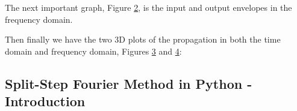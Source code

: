 \documentclass[colorlinks,11pt,a4paper,normalphoto,withhyper,ragged2e]{altareport}
\begin{document}
		\begin{figure}[h]
			\centering
			\scalebox{0.85}{}
			\caption{}
			\label{fig:split-step-intro-2d-time}
		\end{figure}
		
		The next important graph, Figure \ref{fig:split-step-intro-2d-freq}, is the input and output envelopes in the frequency domain. \linebreak
		
		\begin{figure}[h]
			\centering
			\scalebox{0.8}{}
			\caption{}
			\label{fig:split-step-intro-2d-freq}
		\end{figure}	
		
		\pagebreak
		
		Then finally we have the two 3D plots of the propagation in both the time domain and frequency domain, Figures \ref{fig:split-step-intro-3d-time} and \ref{fig:split-step-intro-3d-freq}: \linebreak
				
		\begin{figure}[h]
			\centering
			\scalebox{0.7}{}
			\caption{}
			\label{fig:split-step-intro-3d-time}
		\end{figure}	
		
		\vspace{5mm}
		
		\begin{figure}[h]
			\centering
			\scalebox{0.7}{}
			\caption{}
			\label{fig:split-step-intro-3d-freq}
		\end{figure}	
		
		
		\pagebreak
		
		
		\subsection{Split-Step Fourier Method in Python - Introduction} \label{code:Split_step_fourier_intro}
			
		
\end{document}
